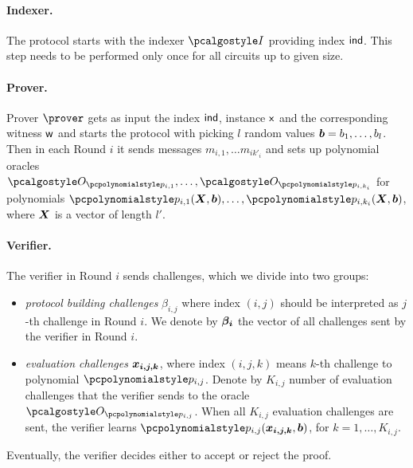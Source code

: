 \documentclass[runningheads,11pt]{llncs}
\let\spvec\vec
\let\vec\accentvec
\let\spvec\vec
\let\vec\spvec
\def\vec#1{\mathchoice{\mbox{\boldmath$\displaystyle#1$}}
  {\mbox{\boldmath$\textstyle#1$}} {\mbox{\boldmath$\scriptstyle#1$}}
  {\mbox{\boldmath$\scriptscriptstyle#1$}}}
\begin{document}
  \paragraph{Indexer.} The protocol starts with the indexer $\indexer$ providing
  index ${\mathsf{ind}}$. This step needs to be performed only once for all circuits up to
  given size. 

  \paragraph{Prover.} Prover $\prover$ gets as input the index ${\mathsf{ind}}$, instance $\mathsf{x}$ and the
  corresponding witness $\mathsf{w}$ and starts the protocol with picking $l$ random values
  $\vec{b} = b_1, \ldots, b_l$. Then in each Round $i$ it sends messages
  $m_{i, 1}, \ldots m_{i k'_i}$ and sets up polynomial oracles
  $\oracleo_{\p{p}_{i, 1}}, \ldots, \oracleo_{\p{p}_{i, k_i}}$ for polynomials
  $\p{p}_{i, 1} (\vec{X}, \vec{b}), \ldots, \p{p}_{i, k_i} (\vec{X}, \vec{b})$, where
  $\vec{X}$ is a vector of length $l'$.
  
  \paragraph{Verifier.} The verifier in Round $i$ sends challenges, which we divide
  into two groups:
  \begin{itemize}
  \item \emph{protocol building challenges} $\beta_{i, j}$ where index $(i, j)$
    should be interpreted as $j$-th challenge in Round $i$. We denote by
    $\vec{\beta_i}$ the vector of all challenges sent by the verifier in Round $i$.
  \item \emph{evaluation challenges} $\vec{x_{i, j, k}}$, where index $(i, j, k)$
    means $k$-th challenge to polynomial $\p{p}_{i, j}$. Denote by $K_{i, j}$ number
    of evaluation challenges that the verifier sends to the oracle
    $\oracleo_{\p{p}_{i, j}}$. When all $K_{i, j}$ evaluation challenges are sent,
    the verifier learns $\p{p}_{i, j} (\vec{x_{i, j, k}}, \vec{b})$, for
    $k = 1, \ldots, K_{i, j}$.
  \end{itemize}

  Eventually, the verifier decides either to accept or reject the proof. 
\end{document}
